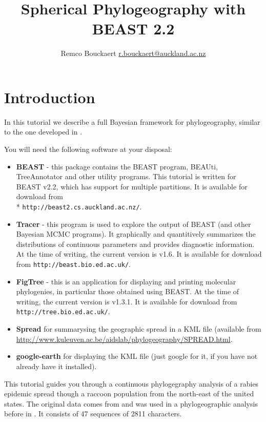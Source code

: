 \documentclass{article}
\newcommand{\BEASTVersion}{2.2}
\newcommand{\TracerVersion}{1.6}
\newcommand{\FigTreeVersion}{1.3.1}
\begin{document}
\title{Spherical Phylogeography with BEAST 2.2}
\author{Remco Bouckaert \url{r.bouckaert@auckland.ac.nz}}
\maketitle

\section{Introduction}


In this tutorial we describe a full Bayesian framework for phylogeography, similar to the one developed in  \cite{Lemey:2009uq}.
 
You will need the following software at your disposal:

\begin{itemize}

\item {\bf BEAST} - this package contains the BEAST program, BEAUti, TreeAnnotator and other utility programs. This tutorial is written for BEAST v{\BEASTVersion}, which has support for multiple partitions. It is available for download from \\* \texttt{http://beast2.cs.auckland.ac.nz/}.
\item {\bf Tracer} - this program is used to explore the output of BEAST (and other Bayesian MCMC programs). It graphically and
quantitively summarizes the distributions of continuous parameters and provides diagnostic information. At the time of
writing, the current version is v{\TracerVersion}. It is available for download from \texttt{http://beast.bio.ed.ac.uk/}.
\item {\bf FigTree} - this is an application for displaying and printing molecular phylogenies, in particular those obtained using
BEAST. At the time of writing, the current version is v{\FigTreeVersion}. It is available for download from \texttt{http://tree.bio.ed.ac.uk/}.
\item {\bf Spread} for summarysing the geographic spread in a KML file (available from \url{http://www.kuleuven.ac.be/aidslab/phylogeography/SPREAD.html}.
\item {\bf google-earth} for displaying the KML file (just google for it, if you have not already have it installed).
\end{itemize}


This tutorial guides you through a continuous phylogegraphy analysis of a rabies epidemic spread though a raccoon population from the north-east of the united states. The original data comes from
\cite{biek:2007hi} and was used in a phylogeographic analysis before in \cite{Lemey:2010hc}. It consists of 47 sequences of 2811 characters.
\end{document}
